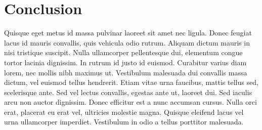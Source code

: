 \documentclass[conference]{IEEEtran}
\begin{document}
\section{Conclusion}

Quisque eget metus id massa pulvinar laoreet sit amet nec ligula. Donec feugiat lacus id mauris convallis, quis vehicula odio rutrum. Aliquam dictum mauris in nisi tristique suscipit. Nulla ullamcorper pellentesque dui, elementum congue tortor lacinia dignissim. In rutrum id justo id euismod. Curabitur varius diam lorem, nec mollis nibh maximus ut. Vestibulum malesuada dui convallis massa dictum, vel euismod tellus hendrerit. Etiam vitae urna faucibus, mattis tellus sed, scelerisque ante. Sed vel lectus convallis, egestas ante ut, laoreet dui. Sed iaculis arcu non auctor dignissim. Donec efficitur est a nunc accumsan cursus. Nulla orci erat, placerat eu erat vel, ultricies molestie magna. Quisque eleifend lacus vel urna ullamcorper imperdiet. Vestibulum in odio a tellus porttitor malesuada.



\end{document}
